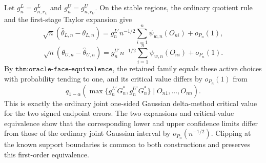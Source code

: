 Let \(g_n^L=g^L_{n,r_L}\) and \(g_n^U=g^U_{n,r_U}\). On the stable regions, the ordinary quotient rule and the first-stage Taylor expansion give
\[
 \sqrt n(\widehat\theta_{L,n}-\theta_{L,n})
 =g_n^{L\prime}n^{-1/2}\sum_{i=1}^n\psi_{w,n}(O_{ni})+o_{P_n}(1),
\]
\[
 \sqrt n(\theta_{U,n}-\widehat\theta_{U,n})
 =g_n^{U\prime}n^{-1/2}\sum_{i=1}^n\psi_{w,n}(O_{ni})+o_{P_n}(1).
\]
By \(\texttt{thm:oracle-face-equivalence}\), the retained family equals these active choices with probability tending to one, and its critical value differs by \(o_{P_n}(1)\) from
\[
 q_{1-\alpha}\!\left(
 \max\{g_n^{L\prime}G_n^*,g_n^{U\prime}G_n^*\}
 \mid O_{n1},\ldots,O_{nn}\right).
\]
This is exactly the ordinary joint one-sided Gaussian delta-method critical value for the two signed endpoint errors. The two expansions and critical-value equivalence show that the corresponding lower and upper confidence limits differ from those of the ordinary joint Gaussian interval by \(o_{P_n}(n^{-1/2})\). Clipping at the known support boundaries is common to both constructions and preserves this first-order equivalence.

